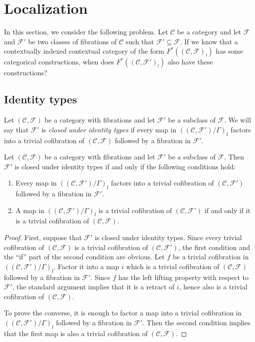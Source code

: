 \documentclass[reqno]{amsart}
\theoremstyle{definition}
\theoremstyle{remark}
\newcommand{\fs}[1]{\mathrm{#1}}
\newcommand{\scat}[1]{\mathcal{#1}}
\newcommand{\Fib}{\mathcal{F}}
\numberwithin{figure}{section}
\begin{document}
\section{Localization}
\label{sec:loc}

In this section, we consider the following problem.
Let $\scat{C}$ be a category and let $\Fib$ and $\Fib'$ be two classes of fibrations of $\scat{C}$ such that $\Fib' \subseteq \Fib$.
If we know that a contextually indexed contextual category of the form $F^*((\scat{C},\Fib)_!)$ has some categorical constructions, when does $F^*((\scat{C},\Fib')_!)$ also have these constructions?

\subsection{Identity types}

Let $(\scat{C},\Fib)$ be a category with fibrations and let $\Fib'$ be a subclass of $\Fib$.
We will say that $\Fib'$ is \emph{closed under identity types} if every map in $((\scat{C},\Fib')/\Gamma)_\fs{f}$ factors into a trivial cofibration of $(\scat{C},\Fib)$ followed by a fibration in $\Fib'$.

\begin{lem}[subfib]
Let $(\scat{C},\Fib)$ be a category with fibrations and let $\Fib'$ be a subclass of $\Fib$.
Then $\Fib'$ is closed under identity types if and only if the following conditions hold:
\begin{enumerate}
\item \label{it:subfib-factor} Every map in $((\scat{C},\Fib')/\Gamma)_\fs{f}$ factors into a trivial cofibration of $(\scat{C},\Fib')$ followed by a fibration in $\Fib'$.
\item \label{it:subfib-we} A map in $((\scat{C},\Fib')/\Gamma)_\fs{f}$ is a trivial cofibration of $(\scat{C},\Fib')$ if and only if it is a trivial cofibration of $(\scat{C},\Fib)$.
\end{enumerate}
\end{lem}
\begin{proof}
First, suppose that $\Fib'$ is closed under identity types.
Since every trivial cofibration of $(\scat{C},\Fib)$ is a trivial cofibration of $(\scat{C},\Fib')$, the first condition and the ``if'' part of the second condition are obvious.
Let $f$ be a trivial cofibration in $((\scat{C},\Fib')/\Gamma)_\fs{f}$.
Factor it into a map $i$ which is a trivial cofibration of $(\scat{C},\Fib)$ followed by a fibration in $\Fib'$.
Since $f$ has the left lifting property with respect to $\Fib'$, the standard argument implies that it is a retract of $i$, hence also is a trivial cofibration of $(\scat{C},\Fib)$.

To prove the converse, it is enough to factor a map into a trivial cofibration in $((\scat{C},\Fib')/\Gamma)_\fs{f}$ followed by a fibration in $\Fib'$.
Then the second condition implies that the first map is also a trivial cofibration of $(\scat{C},\Fib)$.
\end{proof}
\end{document}
